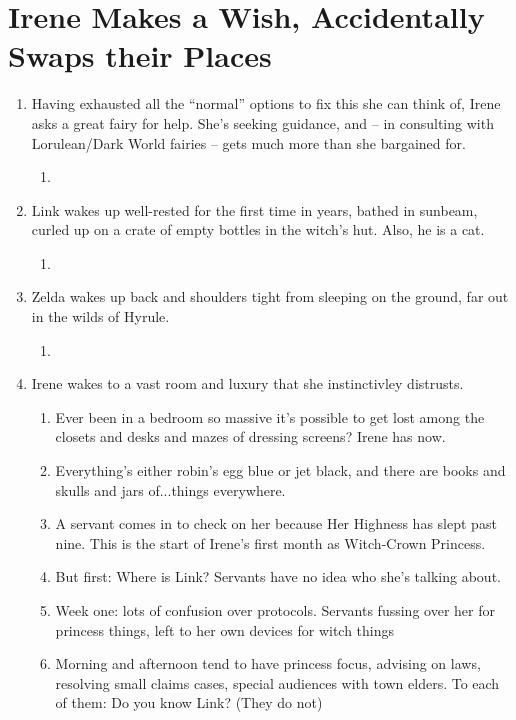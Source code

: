 \documentclass[../FGP.tex]{subfiles}
\begin{document}
\section{Irene Makes a Wish, Accidentally Swaps their Places}
\begin{enumerate}
    \item Having exhausted all the ``normal'' options to fix this she can think of, Irene asks a great fairy for help. She's seeking guidance, and -- in consulting with Lorulean/Dark World fairies -- gets much more than she bargained for.\begin{enumerate} \item \end{enumerate}
    \item Link wakes up well-rested for the first time in years, bathed in sunbeam, curled up on a crate of empty bottles in the witch's hut. Also, he is a cat.\begin{enumerate} \item \end{enumerate}
    \item Zelda wakes up back and shoulders tight from sleeping on the ground, far out in the wilds of Hyrule.\begin{enumerate} \item \end{enumerate}
    \item Irene wakes to a vast room and luxury that she instinctivley distrusts. \begin{enumerate} \item Ever been in a bedroom so massive it's possible to get lost among the closets and desks and mazes of dressing screens? Irene has now.
    \item Everything's either robin's egg blue or jet black, and there are books and skulls and jars of...things everywhere.
    \item A servant comes in to check on her because Her Highness has slept past nine. This is the start of Irene's first month as Witch-Crown Princess. 
    \item But first: Where is Link? Servants have no idea who she's talking about.
    \item Week one: lots of confusion over protocols. Servants fussing over her for princess things, left to her own devices for witch things
    \item Morning and afternoon tend to have princess focus, advising on laws, resolving small claims cases, special audiences with town elders. To each of them: Do you know Link? (They do not)

\end{enumerate}
\end{enumerate}
\end{document}
